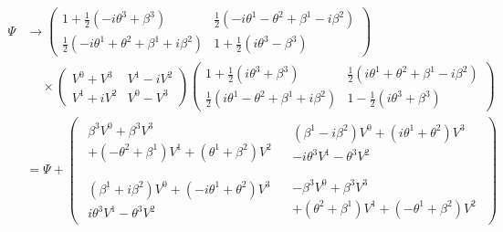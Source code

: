 \begin{equation}
  \begin{aligned}
    \Psi & \rightarrow \begin{pmatrix}
                         1 + \frac{1}{2}(-i\theta^3+\beta^3)                     & \frac{1}{2}(-i\theta^1 - \theta^2 + \beta^1 - i\beta^2) \\
                         \frac{1}{2}(-i\theta^1 + \theta^2 + \beta^1 + i\beta^2) & 1 + \frac{1}{2}(i\theta^3-\beta^3)
                       \end{pmatrix}             \\
         & \quad\ \times \begin{pmatrix}
                           V^0+V^3  & V^1-iV^2 \\
                           V^1+iV^2 & V^0-V^3
                         \end{pmatrix}
    \begin{pmatrix}
      1 + \frac{1}{2}(i\theta^3+\beta^3)                     & \frac{1}{2}(i\theta^1 + \theta^2 + \beta^1 - i\beta^2) \\
      \frac{1}{2}(i\theta^1 - \theta^2 + \beta^1 + i\beta^2) & 1 - \frac{1}{2}(i\theta^3+\beta^3)
    \end{pmatrix}                                  \\
         & = \Psi + \begin{pmatrix}
                      \begin{matrix}
        \beta^3 V^0 + \beta^3 V^3 \\ + (- \theta^2 + \beta^1) V^1 + (\theta^1 + \beta^2) V^2
      \end{matrix}
                       &
                      \begin{matrix}
        (\beta^1 - i\beta^2) V^0 + (i\theta^1 + \theta^2) V^3 \\ -i\theta^3 V^1 - \theta^3 V^2
      \end{matrix}
                      \\ \mbox{} \\
                      \begin{matrix}
        (\beta^1 + i\beta^2) V^0 + (-i\theta^1 + \theta^2) V^3 \\ i\theta^3 V^1 - \theta^3 V^2
      \end{matrix}
                       &
                      \begin{matrix}
        -\beta^3 V^0 + \beta^3 V^3 \\ + (\theta^2 + \beta^1) V^1 + (-\theta^1 + \beta^2) V^2

\end{matrix}
\end{pmatrix}
\end{aligned}
\end{equation}
